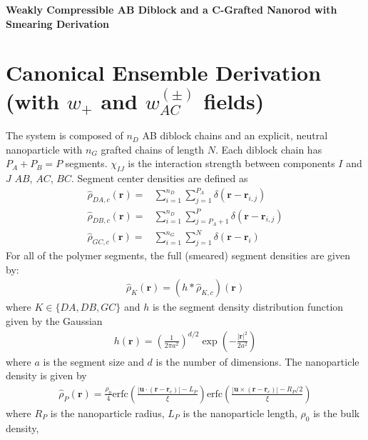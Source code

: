 \documentclass{article}
\begin{document}
  \begin{center}
    \textbf{Weakly Compressible AB Diblock and a C-Grafted Nanorod with
    Smearing Derivation}
  \end{center}
  
  \section{Canonical Ensemble Derivation (with $w_+$ and $w_{AC}^{(\pm)}$ fields)}
  
  The system is composed of $n_D$ AB diblock chains and an explicit, neutral
    nanoparticle with $n_G$ grafted chains of length $N$.
  Each diblock chain has $P_A + P_B = P$ segments.
  $\chi_{IJ}$ is the interaction strength between components $I$ and $J$
    $AB$, $AC$, $BC$.
  Segment center densities are defined as
  \begin{align*}
    \hat{\rho}_{DA,c} (\mathbf{r}) =&
      \sum_{i=1}^{n_D} \sum_{j=1}^{P_A}
      \delta(\mathbf{r} - \mathbf{r}_{i,j}) \\
    \hat{\rho}_{DB,c} (\mathbf{r}) =&
      \sum_{i=1}^{n_D} \sum_{j=P_A+1}^{P}
      \delta(\mathbf{r} - \mathbf{r}_{i,j}) \\
    \hat{\rho}_{GC,c} (\mathbf{r}) =&
      \sum_{i=1}^{n_G} \sum_{j=1}^{N}
      \delta(\mathbf{r} - \mathbf{r}_i)
  \end{align*}
  For all of the polymer segments, the full (smeared) segment densities are given
    by:
  \begin{align*}
    \hat{\rho}_K(\mathbf{r}) = (h \ast \hat{\rho}_{K,c})(\mathbf{r})
  \end{align*}
  where $K \in \{ DA, DB, GC\}$ and $h$ is the segment density distribution
    function given by the Gaussian
  \begin{align*}
    h(\mathbf{r}) = \left( \frac{1}{2\pi a^2} \right)^{d/2}
    \exp \left( - \frac{|\mathbf{r}|^2}{2a^2}  \right)
  \end{align*}
  where $a$ is the segment size and $d$ is the number of dimensions.
  The nanoparticle density is given by
  \begin{align*}
    \hat{\rho}_P(\mathbf{r}) =
      \frac{\rho_0}{4}
      \textrm{erfc} \left(
        \frac{|\mathbf{u} \cdot (\mathbf{r} - \mathbf{r}_c)| - L_P}{\xi} 
      \right)
      \textrm{erfc} \left(
        \frac{|\mathbf{u} \times (\mathbf{r} - \mathbf{r}_c)| - R_P/2}{\xi}       
      \right)
  \end{align*}
  where $R_P$ is the nanoparticle radius, $L_P$ is the nanoparticle length, $\rho_0$ is the bulk density,
\end{document}
